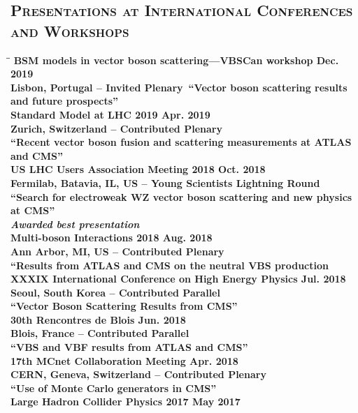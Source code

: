 \documentclass[10pt]{res} %
\begin{document}
\begin{resume}
\section{\textsc{Presentations at International Conferences and Workshops}}
\vspace{-0.1in}
\begin{tabbing}
\hspace{2.3in}\= \hspace{2.6in}\= \kill %
\bf{BSM models in vector boson scattering---VBSCan workshop} 		 \> \>	    Dec. 2019 \\
Lisbon, Portugal -- Invited Plenary\
``Vector boson scattering results and future prospects'' \\
\bf{Standard Model at LHC 2019} 		 \> \>	    Apr. 2019 \\
Zurich, Switzerland -- Contributed Plenary \\
``Recent vector boson fusion and scattering measurements at ATLAS and CMS'' \\
\bf{US LHC Users Association Meeting 2018} 		 \> \>	    Oct. 2018 \\
Fermilab, Batavia, IL, US -- Young Scientists Lightning Round \\
``Search for electroweak WZ vector boson scattering and new physics at CMS'' \\
\emph{Awarded best presentation } \\
\bf{Multi-boson Interactions 2018} 		 \> \>	    Aug. 2018 \\
Ann Arbor, MI, US -- Contributed Plenary \\
``Results from ATLAS and CMS on the neutral VBS production \\
\bf{XXXIX International Conference on High Energy Physics} 		 \> \>	    Jul. 2018 \\
Seoul, South Korea -- Contributed Parallel\\
``Vector Boson Scattering Results from CMS'' \\
\bf{30th Rencontres de Blois} 		 \> \>	    Jun. 2018 \\
Blois, France -- Contributed Parallel\\
``VBS and VBF results from ATLAS and CMS'' \\
\bf{17th MCnet Collaboration Meeting} 		 \> \>	    Apr. 2018 \\
CERN, Geneva, Switzerland -- Contributed Plenary\\
``Use of Monte Carlo generators in CMS'' \\
\bf{Large Hadron Collider Physics 2017} 		 \> \>	    May 2017 \\

\end{tabbing}
\end{resume}
\end{document}
